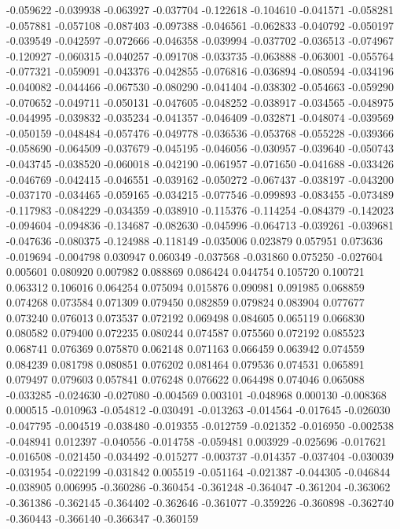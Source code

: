 -0.059622
-0.039938
-0.063927
-0.037704
-0.122618
-0.104610
-0.041571
-0.058281
-0.057881
-0.057108
-0.087403
-0.097388
-0.046561
-0.062833
-0.040792
-0.050197
-0.039549
-0.042597
-0.072666
-0.046358
-0.039994
-0.037702
-0.036513
-0.074967
-0.120927
-0.060315
-0.040257
-0.091708
-0.033735
-0.063888
-0.063001
-0.055764
-0.077321
-0.059091
-0.043376
-0.042855
-0.076816
-0.036894
-0.080594
-0.034196
-0.040082
-0.044466
-0.067530
-0.080290
-0.041404
-0.038302
-0.054663
-0.059290
-0.070652
-0.049711
-0.050131
-0.047605
-0.048252
-0.038917
-0.034565
-0.048975
-0.044995
-0.039832
-0.035234
-0.041357
-0.046409
-0.032871
-0.048074
-0.039569
-0.050159
-0.048484
-0.057476
-0.049778
-0.036536
-0.053768
-0.055228
-0.039366
-0.058690
-0.064509
-0.037679
-0.045195
-0.046056
-0.030957
-0.039640
-0.050743
-0.043745
-0.038520
-0.060018
-0.042190
-0.061957
-0.071650
-0.041688
-0.033426
-0.046769
-0.042415
-0.046551
-0.039162
-0.050272
-0.067437
-0.038197
-0.043200
-0.037170
-0.034465
-0.059165
-0.034215
-0.077546
-0.099893
-0.083455
-0.073489
-0.117983
-0.084229
-0.034359
-0.038910
-0.115376
-0.114254
-0.084379
-0.142023
-0.094604
-0.094836
-0.134687
-0.082630
-0.045996
-0.064713
-0.039261
-0.039681
-0.047636
-0.080375
-0.124988
-0.118149
-0.035006
0.023879
0.057951
0.073636
-0.019694
-0.004798
0.030947
0.060349
-0.037568
-0.031860
0.075250
-0.027604
0.005601
0.080920
0.007982
0.088869
0.086424
0.044754
0.105720
0.100721
0.063312
0.106016
0.064254
0.075094
0.015876
0.090981
0.091985
0.068859
0.074268
0.073584
0.071309
0.079450
0.082859
0.079824
0.083904
0.077677
0.073240
0.076013
0.073537
0.072192
0.069498
0.084605
0.065119
0.066830
0.080582
0.079400
0.072235
0.080244
0.074587
0.075560
0.072192
0.085523
0.068741
0.076369
0.075870
0.062148
0.071163
0.066459
0.063942
0.074559
0.084239
0.081798
0.080851
0.076202
0.081464
0.079536
0.074531
0.065891
0.079497
0.079603
0.057841
0.076248
0.076622
0.064498
0.074046
0.065088
-0.033285
-0.024630
-0.027080
-0.004569
0.003101
-0.048968
0.000130
-0.008368
0.000515
-0.010963
-0.054812
-0.030491
-0.013263
-0.014564
-0.017645
-0.026030
-0.047795
-0.004519
-0.038480
-0.019355
-0.012759
-0.021352
-0.016950
-0.002538
-0.048941
0.012397
-0.040556
-0.014758
-0.059481
0.003929
-0.025696
-0.017621
-0.016508
-0.021450
-0.034492
-0.015277
-0.003737
-0.014357
-0.037404
-0.030039
-0.031954
-0.022199
-0.031842
0.005519
-0.051164
-0.021387
-0.044305
-0.046844
-0.038905
0.006995
-0.360286
-0.360454
-0.361248
-0.364047
-0.361204
-0.363062
-0.361386
-0.362145
-0.364402
-0.362646
-0.361077
-0.359226
-0.360898
-0.362740
-0.360443
-0.366140
-0.366347
-0.360159

